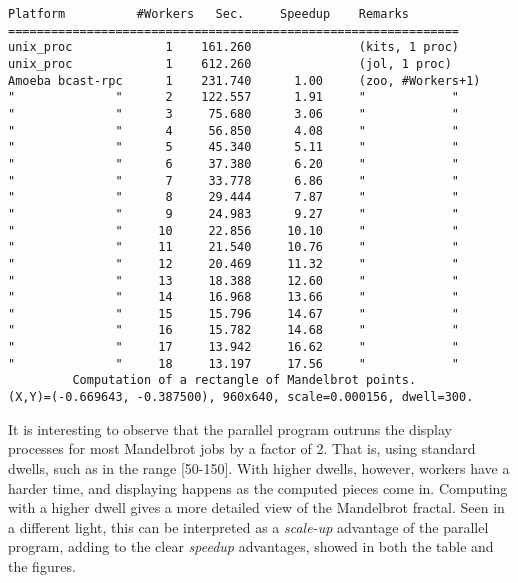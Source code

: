 \begin{verbatim}
Platform          #Workers   Sec.     Speedup    Remarks
===============================================================
unix_proc             1    161.260               (kits, 1 proc)
unix_proc             1    612.260               (jol, 1 proc)
Amoeba bcast-rpc      1    231.740      1.00     (zoo, #Workers+1)
"              "      2    122.557      1.91     "            "
"              "      3     75.680      3.06     "            "
"              "      4     56.850      4.08     "            "
"              "      5     45.340      5.11     "            "
"              "      6     37.380      6.20     "            "
"              "      7     33.778      6.86     "            "
"              "      8     29.444      7.87     "            "
"              "      9     24.983      9.27     "            "
"              "     10     22.856     10.10     "            "
"              "     11     21.540     10.76     "            "
"              "     12     20.469     11.32     "            "
"              "     13     18.388     12.60     "            "
"              "     14     16.968     13.66     "            "
"              "     15     15.796     14.67     "            "
"              "     16     15.782     14.68     "            "
"              "     17     13.942     16.62     "            "
"              "     18     13.197     17.56     "            "
         Computation of a rectangle of Mandelbrot points. 
(X,Y)=(-0.669643, -0.387500), 960x640, scale=0.000156, dwell=300.
\end{verbatim}
It is interesting to observe that the parallel program outruns the
display processes for most Mandelbrot jobs by a factor of 2. That is, using 
standard dwells, such as in the range [50-150]. With higher dwells, however,
workers have a harder time, and displaying happens as the computed pieces
come in.
\Skip
Computing with a higher dwell gives a more detailed view of the Mandelbrot
fractal. Seen in a different light, this can be interpreted as a {\em scale-up}
advantage of the parallel program, adding to the clear {\em speedup} 
advantages, showed in both the table and the figures. 





